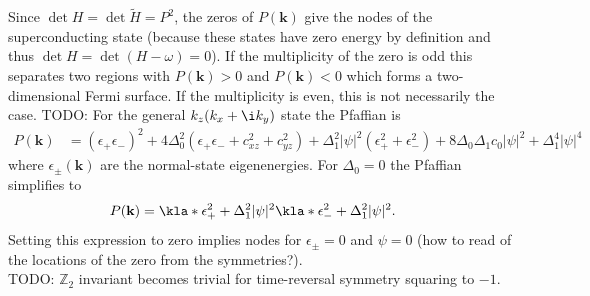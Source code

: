 \documentclass[english, parskip=full]{scrartcl}
\begin{document}
Since $\det H=\det\tilde{H}=P^2$, the zeros of $P(\textbf{k})$ give the nodes of the superconducting state (because these states have zero energy by definition and thus $\det H = \det (H-\omega) = 0$).
If the multiplicity of the zero is odd this separates two regions with $P(\textbf{k})>0$ and $P(\textbf{k})<0$ which forms a two-dimensional Fermi surface.
If the multiplicity is even, this is not necessarily the case.
TODO: For the general $k_z(k_x+\i k_y)$ state the Pfaffian is
\begin{align}
P(\textbf{k}) &= (\epsilon_+\epsilon_-)^2 + 4\Delta_0^2 (\epsilon_+\epsilon_- + c_{xz}^2 + c_{yz}^2) + \Delta_1^2|\psi|^2(\epsilon_+^2 + \epsilon_-^2) + 8\Delta_0\Delta_1 c_0|\psi|^2 + \Delta_1^4|\psi|^4
\end{align}
where $\epsilon_\pm(\textbf{k})$ are the normal-state eigenenergies.
For $\Delta_0=0$ the Pfaffian simplifies to
\begin{align}
P(\textbf{k}) &= \kla*{\epsilon_+^2 + \Delta_1^2 |\psi|^2} \kla*{\epsilon_-^2 + \Delta_1^2 |\psi|^2}.
\end{align}
Setting this expression to zero implies nodes for $\epsilon_\pm = 0$ and $\psi =0$ (\color{red}how to read of the locations of the zero from the symmetries?\color{black}).\\
TODO: $\mathbb{Z}_2$ invariant becomes trivial for time-reversal symmetry squaring to $-1$.
\end{document}
